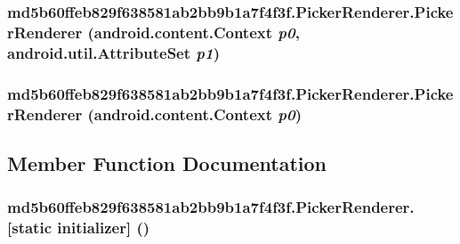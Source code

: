 \hypertarget{classmd5b60ffeb829f638581ab2bb9b1a7f4f3f_1_1_picker_renderer_9fd2bcb1d380420ff920cacf999ff555}{
\subsubsection[{PickerRenderer}]{\setlength{\rightskip}{0pt plus 5cm}md5b60ffeb829f638581ab2bb9b1a7f4f3f.PickerRenderer.PickerRenderer (android.content.Context {\em p0}, \/  android.util.AttributeSet {\em p1})}}
\label{classmd5b60ffeb829f638581ab2bb9b1a7f4f3f_1_1_picker_renderer_9fd2bcb1d380420ff920cacf999ff555}


\hypertarget{classmd5b60ffeb829f638581ab2bb9b1a7f4f3f_1_1_picker_renderer_9880f6ec6bfd5158d950ca6e6f6a9bf9}{
\subsubsection[{PickerRenderer}]{\setlength{\rightskip}{0pt plus 5cm}md5b60ffeb829f638581ab2bb9b1a7f4f3f.PickerRenderer.PickerRenderer (android.content.Context {\em p0})}}
\label{classmd5b60ffeb829f638581ab2bb9b1a7f4f3f_1_1_picker_renderer_9880f6ec6bfd5158d950ca6e6f6a9bf9}




\subsection{Member Function Documentation}
\hypertarget{classmd5b60ffeb829f638581ab2bb9b1a7f4f3f_1_1_picker_renderer_2225d8c4d5ee2120239beb2993665437}{
\subsubsection[{[static initializer]}]{\setlength{\rightskip}{0pt plus 5cm}md5b60ffeb829f638581ab2bb9b1a7f4f3f.PickerRenderer.\mbox{[}static initializer\mbox{]} ()}}
\label{classmd5b60ffeb829f638581ab2bb9b1a7f4f3f_1_1_picker_renderer_2225d8c4d5ee2120239beb2993665437}




